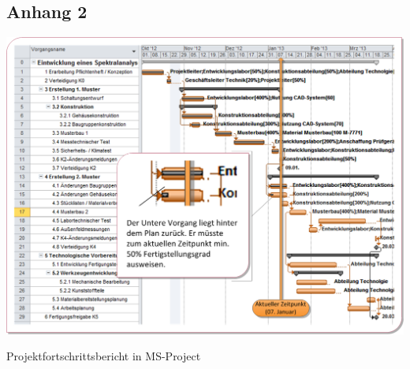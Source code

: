 \subsection{Anhang 2}
\label{sec:Anhang2}
\includegraphics[width=1\textwidth]{Images/MSPfortschritt.png} 
\begin{center}
   Projektfortschrittsbericht in MS-Project
\end{center}
\newpage